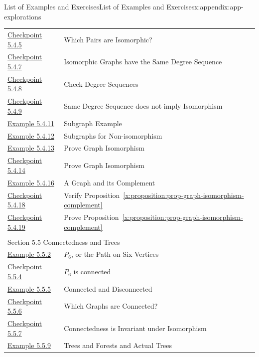 \documentclass[oneside,10pt,]{book}
\newcommand{\xreffont}{\relax}
\numberwithin{equation}{section}
\begin{document}
\begin{appendixptx}{List of Examples and Exercises}{}{List of Examples and Exercises}{}{}{x:appendix:app-explorations}
\begin{longtable}[l]{ll}
\hyperref[x:exercise:ex-graph-determine-isomorphism]{Checkpoint 5.4.5}& Which Pairs are Isomorphic?\\
\hyperref[x:exercise:ex-graph-isomorphism-degree]{Checkpoint 5.4.7}& Isomorphic Graphs have the Same Degree Sequence\\
\hyperref[x:exercise:ex-graph-isomorphism-degree-check]{Checkpoint 5.4.8}& Check Degree Sequences\\
\hyperref[x:exercise:ex-graph-isomorphism-degree-converse]{Checkpoint 5.4.9}& Same Degree Sequence does not imply Isomorphism\\
\hyperref[x:example:eg-subgraph]{Example 5.4.11}& Subgraph Example\\
\hyperref[x:example:eg-subgraph-not-isomorphic]{Example 5.4.12}& Subgraphs for Non-isomorphism\\
\hyperref[x:example:eg-graph-construct-isomorphism]{Example 5.4.13}& Prove Graph Isomorphism\\
\hyperref[x:exercise:ex-graph-prove-isomorphic]{Checkpoint 5.4.14}& Prove Graph Isomorphism\\
\hyperref[x:example:eg-graph-complement]{Example 5.4.16}& A Graph and its Complement\\
\hyperref[x:exercise:ex-graph-isomorphism-complement]{Checkpoint 5.4.18}& Verify Proposition~{\xreffont\ref*{x:proposition:prop-graph-isomorphism-complement}}\\
\hyperref[x:exercise:ex-graph-prove-complement]{Checkpoint 5.4.19}& Prove Proposition~{\xreffont\ref*{x:proposition:prop-graph-isomorphism-complement}}\\
\multicolumn{2}{l}{\null}\\[1.5ex] \multicolumn{2}{l}{\large Section 5.5 Connectedness and Trees}\\[0.5ex]
\hyperref[x:example:eg-path-graph]{Example 5.5.2}& \(P_6\), or the Path on Six Vertices\\
\hyperref[x:exercise:ex-path-connected]{Checkpoint 5.5.4}& \(P_6\) is connected\\
\hyperref[x:example:eg-graph-connected-component]{Example 5.5.5}& Connected and Disconnected\\
\hyperref[x:exercise:ex-which-connected]{Checkpoint 5.5.6}& Which Graphs are Connected?\\
\hyperref[x:exercise:ex-isomorphic-connected]{Checkpoint 5.5.7}& Connectedness is Invariant under Isomorphism\\
\hyperref[x:example:eg-tree-forest]{Example 5.5.9}& Trees and Forests and Actual Trees\\

\end{longtable}
\end{appendixptx}
\end{document}
